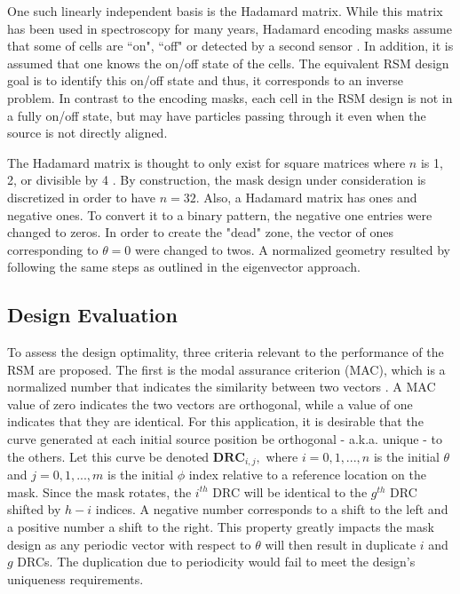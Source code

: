 \documentclass[3p,times]{elsarticle}
\begin{document}
One such linearly independent basis is the Hadamard matrix.  
While this matrix has been used in spectroscopy for many years, Hadamard encoding masks assume that some of cells are ``on", ``off" or detected by a second sensor \cite{DeVerse00}.  
In addition, it is assumed that one knows the on/off state of the cells.  
The equivalent RSM design goal is to identify this on/off state and thus, it corresponds to an inverse problem.  
In contrast to the encoding masks, each cell in the RSM design is not in a fully on/off state, but may have particles passing through it even when the source is not directly aligned.

The Hadamard matrix is thought to only exist for square matrices where $n$ is 1, 2, or divisible by 4 \cite{Sloane76}.  
By construction, the mask design under consideration is discretized in order to have $n=32$.  
Also, a Hadamard matrix has ones and negative ones.  
To convert it to a binary pattern, the negative one entries were changed to zeros.
In order to create the "dead" zone, the vector of ones corresponding to $\theta=0$ were changed to twos.  
A normalized geometry resulted by following the same steps as outlined in the eigenvector approach.

\subsection{Design Evaluation}
\label{sec:Eval}
To assess the design optimality, three criteria relevant to the performance of the RSM are proposed.  
The first is the modal assurance criterion (MAC), which is a normalized number that indicates the similarity between two vectors \cite{Allemang03}.  
A MAC value of zero indicates the two vectors are orthogonal, while a value of one indicates that they are identical.  
For this application, it is desirable that the curve generated at each initial source position be orthogonal - a.k.a. unique - to the others.  
Let this curve be denoted $\mathbf{DRC}_{i,j},$ where $i=0,1,...,n$ is the initial $\theta$ and $j=0,1,...,m$ is the initial $\phi$ index relative to a reference location on the mask.  
Since the mask rotates, the $i^{th}$ DRC will be identical to the $g^{th}$ DRC shifted by $h-i$ indices.  
A negative number corresponds to a shift to the left and a positive number a shift to the right.  
This property greatly impacts the mask design as any periodic vector with respect to $\theta$ will then result in duplicate $i$ and $g$ DRCs.  
The duplication due to periodicity would fail to meet the design's uniqueness requirements.
\end{document}
